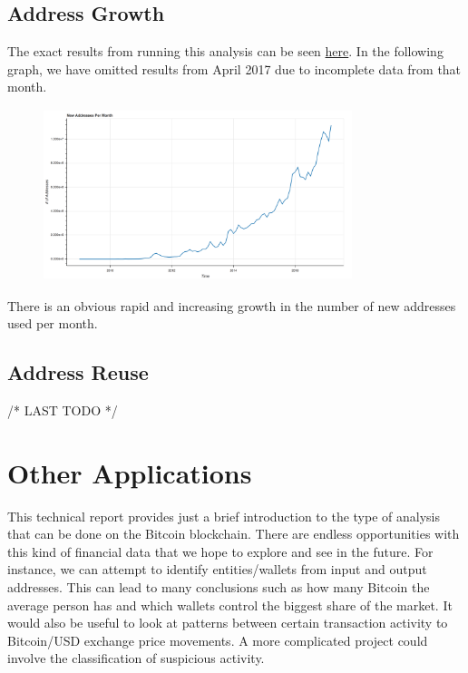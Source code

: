 \documentclass[9pt,twocolumn,twoside]{idsi}
\begin{document}
\subsection{Address Growth}

The exact results from running this analysis can be seen \href{https://github.com/nishilshah17/idsi_bitcoin/blob/d2f1e0257ff684e99356de052eed1c6868ffe82f/data/output/new_addresses/new_addresses.txt}{here}. In the following graph, we have omitted results from April 2017 due to incomplete data from that month.

\begin{figure}[!ht]
\includegraphics[width=9cm, height=5cm]{data/output/new_addresses/new_addresses.png}
\end{figure}

There is an obvious rapid and increasing growth in the number of new addresses used per month.

\subsection{Address Reuse}

/* LAST TODO */

\section{Other Applications}
This technical report provides just a brief introduction to the type of analysis that can be done on the Bitcoin blockchain. There are endless opportunities with this kind of financial data that we hope to explore and see in the future. For instance, we can attempt to identify entities/wallets from input and output addresses. This can lead to many conclusions such as how many Bitcoin the average person has and which wallets control the biggest share of the market. It would also be useful to look at patterns between certain transaction activity to Bitcoin/USD exchange price movements. A more complicated project could involve the classification of suspicious activity.
\end{document}
